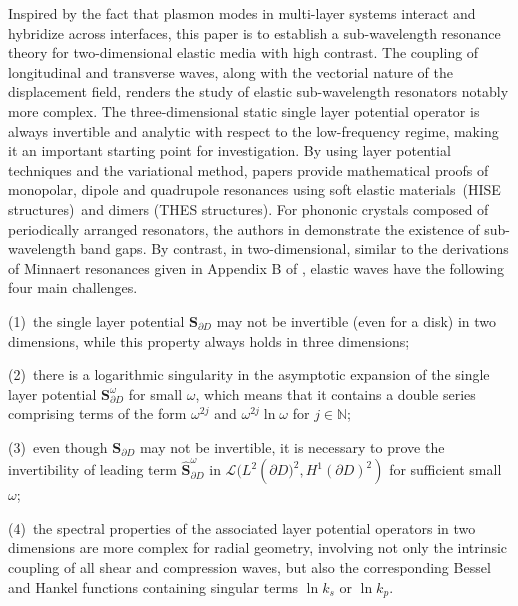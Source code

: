 \documentclass[10pt,reqno,oneside]{amsart}%
\theoremstyle{definition}
\theoremstyle{remark}
\numberwithin{equation}{section}
\numberwithin{equation}{section}
\begin{document}
Inspired by the fact that plasmon modes in multi-layer systems interact and hybridize across interfaces, this paper
is to establish a sub-wavelength resonance theory for two-dimensional elastic media with high contrast. The coupling of longitudinal and transverse waves, along with the vectorial nature of the displacement field, renders the study of elastic sub-wavelength resonators notably more complex. The three-dimensional static single layer potential operator is always invertible and analytic with respect to the low-frequency regime, making it an important starting point for investigation. By using layer potential techniques and the variational method, papers \cite{HLi119141,variationalmethod,HLi2024,HLiLxu2024} provide mathematical proofs of monopolar, dipole and quadrupole resonances using soft elastic materials~(HISE structures)~and dimers (THES structures). For phononic crystals composed of periodically arranged resonators, the authors in \cite{ElasticBandgaps} demonstrate the existence of sub-wavelength band gaps. By contrast, in two-dimensional, similar to the derivations of Minnaert resonances given in Appendix B of \cite{Minnaertresonances}, elastic waves have the following four main challenges.

(1)~the single layer potential $\mathbf{S}_{\partial D}$ may not be invertible (even for a disk) in two dimensions, while this property always holds in three dimensions;

(2)~there is a logarithmic singularity in the asymptotic expansion of the single layer potential $\mathbf{S}_{\partial D}^{\omega}$ for small $\omega$, which means that it contains a double series comprising terms of the form $\omega^{2j}$ and $\omega^{2j}\ln\omega$ for $j\in\mathbb{N}$;

(3)~even though ${\mathbf{S}}_{\partial D}$ may not be invertible, it is necessary to prove the invertibility of leading term $\hat{\mathbf{S}}_{\partial D}^{\omega}$ in $\mathcal{L}(L^{2}\left(\partial D)^{2},H^{1}(\partial D)^{2}\right)$ for sufficient small $\omega$;

(4)~the spectral properties of the associated layer potential operators in two dimensions are more complex for radial geometry, involving not only the intrinsic coupling of all shear and compression waves, but also the corresponding Bessel and Hankel functions containing singular terms $\ln{k_s}$ or $\ln{k_p}$.
\end{document}
